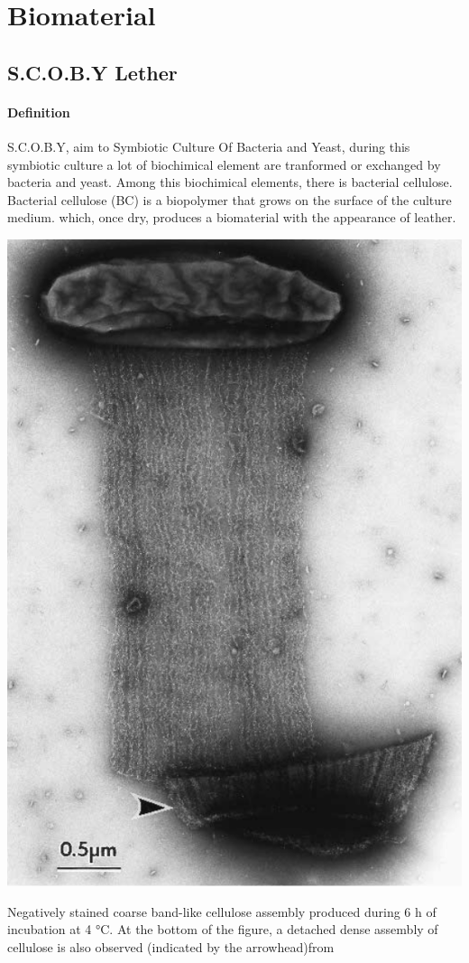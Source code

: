 \section{Biomaterial}
\subsection{S.C.O.B.Y Lether} 

\paragraph[short]{Definition } 
S.C.O.B.Y, aim to Symbiotic Culture Of Bacteria and Yeast, during this symbiotic culture a lot of biochimical element are tranformed or exchanged by bacteria and yeast.
Among this biochimical elements, there is bacterial cellulose. Bacterial cellulose (BC) is a biopolymer that grows on the surface of the culture medium. which, once dry, produces a biomaterial with the appearance of leather. 

\begin{marginfigure}
    \centering
    \includegraphics{images/bacteriaandcellulose.png}
    \caption{Negatively stained coarse band-like cellulose assembly produced during 6 h of incubation at 4 °C. At the bottom of the figure, a
    detached dense assembly of cellulose is also observed (indicated by the arrowhead)from\cite{hirai2002tem}}
    \label{fig:bacteriaandcellulose}
\end{marginfigure}

